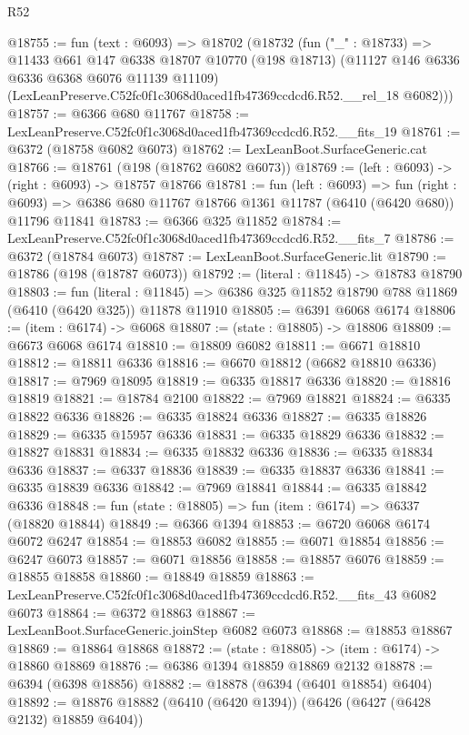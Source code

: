\begin{lexlean}{R52}
\begin{coremodule}
@18755 := fun (text : @6093) =>
  @18702
    (@18732
      (fun ("_" : @18733) =>
      @11433
        @661
        @147
        @6338
        @18707
        @10770
        (@198 @18713)
        (@11127 @146 @6336 @6336 @6368 @6076 @11139 @11109)
        (LexLeanPreserve.C52fc0f1c3068d0aced1fb47369ccdcd6.R52.__rel_18 @6082)))
@18757 := @6366 @680 @11767
@18758 := LexLeanPreserve.C52fc0f1c3068d0aced1fb47369ccdcd6.R52.__fits_19
@18761 := @6372 (@18758 @6082 @6073)
@18762 := LexLeanBoot.SurfaceGeneric.cat
@18766 := @18761 (@198 (@18762 @6082 @6073))
@18769 := (left : @6093) -> (right : @6093) -> @18757 @18766
@18781 := fun (left : @6093) =>
  fun (right : @6093) => @6386 @680 @11767 @18766 @1361 @11787 (@6410 (@6420 @680)) @11796 @11841
@18783 := @6366 @325 @11852
@18784 := LexLeanPreserve.C52fc0f1c3068d0aced1fb47369ccdcd6.R52.__fits_7
@18786 := @6372 (@18784 @6073)
@18787 := LexLeanBoot.SurfaceGeneric.lit
@18790 := @18786 (@198 (@18787 @6073))
@18792 := (literal : @11845) -> @18783 @18790
@18803 := fun (literal : @11845) =>
  @6386 @325 @11852 @18790 @788 @11869 (@6410 (@6420 @325)) @11878 @11910
@18805 := @6391 @6068 @6174
@18806 := (item : @6174) -> @6068
@18807 := (state : @18805) -> @18806
@18809 := @6673 @6068 @6174
@18810 := @18809 @6082
@18811 := @6671 @18810
@18812 := @18811 @6336
@18816 := @6670 @18812 (@6682 @18810 @6336)
@18817 := @7969 @18095
@18819 := @6335 @18817 @6336
@18820 := @18816 @18819
@18821 := @18784 @2100
@18822 := @7969 @18821
@18824 := @6335 @18822 @6336
@18826 := @6335 @18824 @6336
@18827 := @6335 @18826
@18829 := @6335 @15957 @6336
@18831 := @6335 @18829 @6336
@18832 := @18827 @18831
@18834 := @6335 @18832 @6336
@18836 := @6335 @18834 @6336
@18837 := @6337 @18836
@18839 := @6335 @18837 @6336
@18841 := @6335 @18839 @6336
@18842 := @7969 @18841
@18844 := @6335 @18842 @6336
@18848 := fun (state : @18805) => fun (item : @6174) => @6337 (@18820 @18844)
@18849 := @6366 @1394
@18853 := @6720 @6068 @6174 @6072 @6247
@18854 := @18853 @6082
@18855 := @6071 @18854
@18856 := @6247 @6073
@18857 := @6071 @18856
@18858 := @18857 @6076
@18859 := @18855 @18858
@18860 := @18849 @18859
@18863 := LexLeanPreserve.C52fc0f1c3068d0aced1fb47369ccdcd6.R52.__fits_43 @6082 @6073
@18864 := @6372 @18863
@18867 := LexLeanBoot.SurfaceGeneric.joinStep @6082 @6073
@18868 := @18853 @18867
@18869 := @18864 @18868
@18872 := (state : @18805) -> (item : @6174) -> @18860 @18869
@18876 := @6386 @1394 @18859 @18869 @2132
@18878 := @6394 (@6398 @18856)
@18882 := @18878 (@6394 (@6401 @18854) @6404)
@18892 := @18876 @18882 (@6410 (@6420 @1394)) (@6426 (@6427 (@6428 @2132) @18859 @6404))

\end{coremodule}
\end{lexlean}
